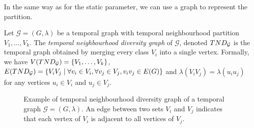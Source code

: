 \noindent In the same way as for the static parameter, we can use a graph to represent the partition.

\begin{definition}
 Let $\mathcal{G}=(G,\lambda)$ be a temporal graph with temporal neighbourhood partition $V_1,\dots,V_k$. The \emph{temporal neighbourhood diversity graph} of $\mathcal{G}$, denoted $TND_{\mathcal{G}}$ is the temporal graph obtained by merging every class $V_i$ into a single vertex. Formally, we have $V(TND_{\mathcal{G}}) = \{V_1,\dots,V_k\}$, $E(TND_{\mathcal{G}}) = \{V_iV_j \mid \forall v_i \in V_i, \forall v_j\in V_j, v_iv_j \in E(G)\}$ and $\lambda(V_iV_j) = \lambda(u_iu_j)$ for any vertices $u_i \in V_i$ and $u_j \in V_j$.
\end{definition}

\begin{figure}
  \centering
  \caption{\label{fig:tmp neighbourhood diversity} Example of temporal neighbourhood diversity graph \tndg of a temporal graph $\mathcal{G}=(G,\lambda)$. An edge between two sets $V_i$ and $V_j$ indicates that each vertex of $V_i$ is adjacent to all vertices of $V_j$.} 
\end{figure}
 
